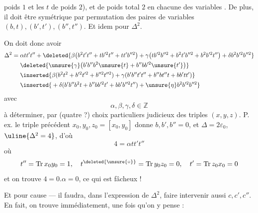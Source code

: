 poids $1$ et les $t$ de poids $2$), et de poids total $2$ en chacune des  variables  .
De plus, il doit être symétrique par permutation des   paires de variables $(b,t),(b',t'),(b'',t'')$. Et idem pour $\Delta^2$.

On doit donc avoir
\[
\begin{aligned}
\Delta^2={}&\alpha tt't''+\deleted{\beta\bigl(b^2t't''+tb'^2t''+tt'b''^2\bigr)+\gamma\bigl(tb'^2b''^2+b^2t'b''^2+b^2b'^2t''\bigr)+\delta b^2b'^2b''^2}\\
&\deleted{\unsure{\gamma}\bigl(b'b''b^2\unsure{t}+b''bb'^2\unsure{t'}\bigr)}\\
&\inserted{\beta(b^2t^2+b'^2t'^2+b''^2t''^2)+\gamma(b'b''t't''+b''bt''t+bb'tt')}\\
&\inserted{{}+\delta(b'b''b^2t+b''bb'^2t'+bb'b''^2t'')+\unsure{\eta}b^2b'^2b''^2}
\end{aligned}
\]
avec
\[
\alpha,\beta,\gamma,\delta\in\mathbb{Z}
\]
à déterminer, par (quatre ?) choix particuliers judicieux des triples $(x,y,z)$. P. ex. le triple précédent $x_0,y_0,z_0=[x_0,y_0]$ donne $b,b',b''=0$, et $\Delta=2\varepsilon_0$, $\uline{\Delta^2=4}$, d'où
\[
4=\alpha tt't''
\]
où
\[
t''=\operatorname{Tr}x_0y_0=1,\quad t^{\deleted{\unsure{\circ}}}=\operatorname{Tr}y_0z_0=0,\quad t'=\operatorname{Tr}z_0x_0=0
\]
et on trouve $4=0.\alpha=0$, ce qui est fâcheux !

Et pour cause --- il faudra, dans l'expression de $\Delta^2$, faire intervenir aussi $c,c',c''$. En fait, on trouve immédiatement, une fois qu'on y pense :
